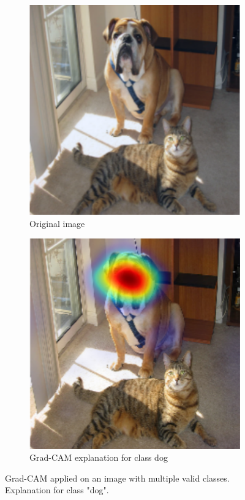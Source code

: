 \begin{figure}[H]
    \centering
    \begin{subfigure}{.5\textwidth}
        \centering
        \includegraphics[width=0.7\linewidth]{chapters/02_methods/images/grad-cam-original.png}
        \caption{Original image}
    \end{subfigure}\hfill%
    \begin{subfigure}{.5\textwidth}
        \centering
        \includegraphics[width=0.7\linewidth]{chapters/02_methods/images/grad-cam-dog.png}
        \caption{Grad-CAM explanation for class dog}
    \end{subfigure}
    \caption{Grad-CAM applied on an image with multiple valid classes. Explanation for class "dog".}
    \label{grad_cam_dog}
\end{figure}

